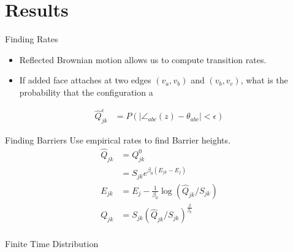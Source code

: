 \documentclass{beamer}
\begin{document}
\section{Results}
\begin{frame}{Finding Rates}
\begin{itemize}
\item Reflected Brownian motion allows us to compute transition rates. 
\item If added face attaches at two edges $(v_a, v_b)$ and $(v_b, v_c)$, what is the probability that the configuration a  
\end{itemize}
\begin{align}
\hat{Q}^{\epsilon}_{jk} &= P(|\angle_{abc}(z) - \theta_{abc} | < \epsilon )
\end{align}
\end{frame}
\begin{frame}{Finding Barriers}
Use empirical rates to find Barrier heights. 
\begin{align}
\hat{Q}_{jk} &= Q^0_{jk} \\
	&= S_{jk}e^{\beta_0(E_{jk} - E_j)} \\
E_{jk} &= E_j-\frac{1}{\beta_0}\log\left(\hat{Q}_{jk}/S_{jk}\right) \\
Q_{jk} &= S_{jk}\left(\hat{Q}_{jk}/S_{jk}\right)^{\frac{\beta}{\beta_0}} \\
\end{align}


\end{frame}
\begin{frame}{Finite Time Distribution}
  \centering
\end{frame}
\end{document}
